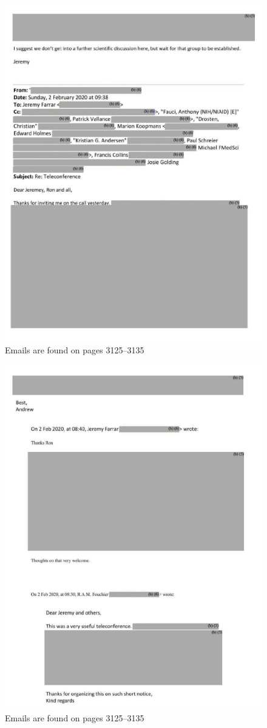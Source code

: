 \documentclass[11pt]{article}
\begin{document}
\begin{figure}[htbp]
\centering
\includegraphics[width=.9\linewidth]{./images/email-zh-4.png}
\caption{Emails are found on pages 3125--3135}
\end{figure}
\begin{figure}[htbp]
\centering
\includegraphics[width=.9\linewidth]{./images/email-zh-5.png}
\caption{Emails are found on pages 3125--3135}
\end{figure}
\end{document}
